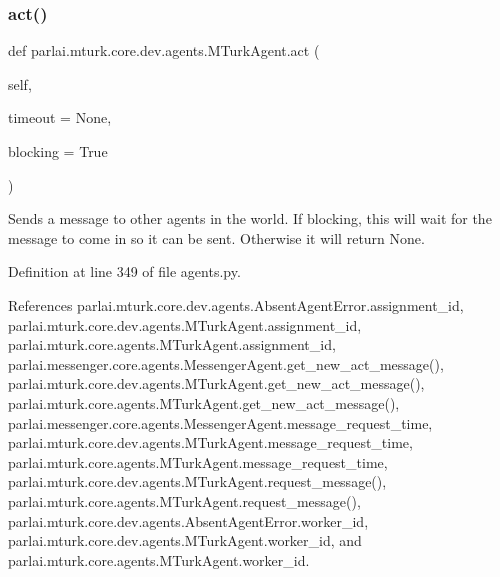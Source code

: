 \subsubsection{\texorpdfstring{act()}{act()}}
{\footnotesize\ttfamily def parlai.\+mturk.\+core.\+dev.\+agents.\+M\+Turk\+Agent.\+act (\begin{DoxyParamCaption}\item[{}]{self,  }\item[{}]{timeout = {\ttfamily None},  }\item[{}]{blocking = {\ttfamily True} }\end{DoxyParamCaption})}

\begin{DoxyVerb}Sends a message to other agents in the world. If blocking, this
will wait for the message to come in so it can be sent. Otherwise
it will return None.
\end{DoxyVerb}
 

Definition at line 349 of file agents.\+py.



References parlai.\+mturk.\+core.\+dev.\+agents.\+Absent\+Agent\+Error.\+assignment\+\_\+id, parlai.\+mturk.\+core.\+dev.\+agents.\+M\+Turk\+Agent.\+assignment\+\_\+id, parlai.\+mturk.\+core.\+agents.\+M\+Turk\+Agent.\+assignment\+\_\+id, parlai.\+messenger.\+core.\+agents.\+Messenger\+Agent.\+get\+\_\+new\+\_\+act\+\_\+message(), parlai.\+mturk.\+core.\+dev.\+agents.\+M\+Turk\+Agent.\+get\+\_\+new\+\_\+act\+\_\+message(), parlai.\+mturk.\+core.\+agents.\+M\+Turk\+Agent.\+get\+\_\+new\+\_\+act\+\_\+message(), parlai.\+messenger.\+core.\+agents.\+Messenger\+Agent.\+message\+\_\+request\+\_\+time, parlai.\+mturk.\+core.\+dev.\+agents.\+M\+Turk\+Agent.\+message\+\_\+request\+\_\+time, parlai.\+mturk.\+core.\+agents.\+M\+Turk\+Agent.\+message\+\_\+request\+\_\+time, parlai.\+mturk.\+core.\+dev.\+agents.\+M\+Turk\+Agent.\+request\+\_\+message(), parlai.\+mturk.\+core.\+agents.\+M\+Turk\+Agent.\+request\+\_\+message(), parlai.\+mturk.\+core.\+dev.\+agents.\+Absent\+Agent\+Error.\+worker\+\_\+id, parlai.\+mturk.\+core.\+dev.\+agents.\+M\+Turk\+Agent.\+worker\+\_\+id, and parlai.\+mturk.\+core.\+agents.\+M\+Turk\+Agent.\+worker\+\_\+id.

